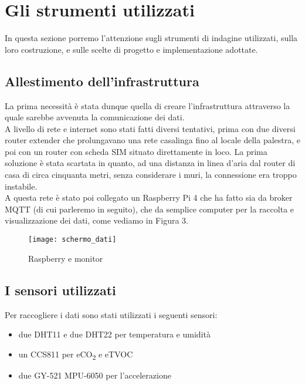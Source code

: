 \documentclass[fleqn,10pt]{SelfArx} %
\begin{document}

\section{Gli strumenti utilizzati}

In questa sezione porremo l'attenzione sugli strumenti di indagine utilizzati, sulla loro costruzione, 
e sulle scelte di progetto e implementazione adottate.

\subsection{Allestimento dell'infrastruttura}

La prima necessità è stata dunque quella di creare l'infrastruttura attraverso la quale sarebbe avvenuta la 
comunicazione dei dati.\\
A livello di rete e internet sono stati fatti diversi tentativi, prima con due diversi router extender che 
prolungavano una rete casalinga fino al locale della palestra, e poi con un router con scheda SIM 
situato direttamente in loco. La prima soluzione è stata scartata in quanto, ad una distanza in linea d'aria 
dal router di casa di circa cinquanta metri, senza considerare i muri, la connessione era troppo instabile.\\

A questa rete è stato poi collegato un Raspberry Pi 4 che ha fatto sia da broker MQTT (di cui parleremo in seguito), 
che da semplice computer per la raccolta e visualizzazione dei dati, come vediamo in Figura 3.

\begin{figure}[htb!]\centering
	\texttt{[image: schermo\_dati]}
	\caption{Raspberry e monitor}
	\label{fig:schermo}
\end{figure}

\subsection{I sensori utilizzati}

Per raccogliere i dati sono stati utilizzati i seguenti sensori:

\begin{itemize}[noitemsep] %
	\item due DHT11 e due DHT22 per temperatura e umidità
	\item un CCS811 per eCO\textsubscript{2} e eTVOC
	\item due GY-521 MPU-6050 per l'accelerazione
\end{itemize}
\end{document}
